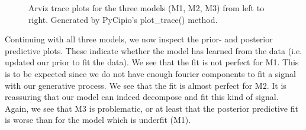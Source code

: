 \documentclass{article}
\begin{document}
\begin{figure}[H]
    \centering
    \quad
    \quad
    \caption{Arviz trace plots for the three models (M1, M2, M3) from left to right. Generated by PyCipio's plot\_trace() method.}
\end{figure}

Continuing with all three models, we now inspect the prior- and posterior predictive plots. These indicate whether the model has learned from the data (i.e. updated our prior to fit the data). We see that the fit is not perfect for M1. This is to be expected since we do not have enough fourier components to fit a signal with our generative process. We see that the fit is almost perfect for M2. It is reassuring that our model can indeed decompose and fit this kind of signal. Again, we see that M3 is problematic, or at least that the posterior predictive fit is worse than for the model which is underfit (M1). 
\end{document}
